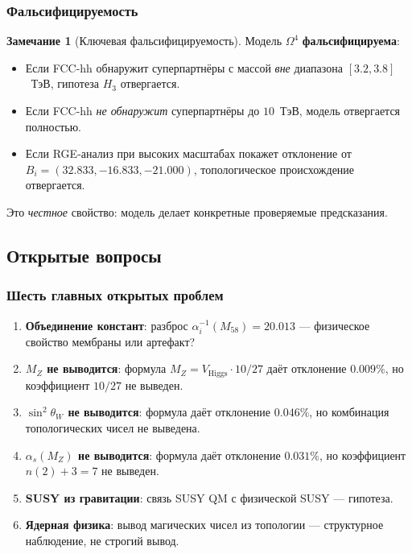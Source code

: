 \documentclass[11pt,a4paper]{article}
\newcommand{\Om}{\ensuremath{\Omega^4}}
\theoremstyle{definition}
\newtheorem{remark}[theorem]{Замечание}
\begin{document}
\subsubsection{Фальсифицируемость}

\begin{remark}[Ключевая фальсифицируемость]
\label{rem:conclusions-falsifiability}
Модель $\Om$ \textbf{фальсифицируема}:
\begin{itemize}
    \item Если FCC-hh обнаружит суперпартнёры с массой
          \emph{вне} диапазона $[3.2, 3.8]$~ТэВ,
          гипотеза $H_3$ отвергается.
    \item Если FCC-hh \emph{не обнаружит} суперпартнёры
          до $10$~ТэВ, модель отвергается полностью.
    \item Если RGE-анализ при высоких масштабах покажет
          отклонение от $B_i = (32.833, -16.833, -21.000)$,
          топологическое происхождение отвергается.
\end{itemize}
Это \emph{честное} свойство: модель делает конкретные
проверяемые предсказания.
\end{remark}

\subsection{Открытые вопросы}
\label{subsec:conclusions-open}

\subsubsection{Шесть главных открытых проблем}

\begin{enumerate}
    \item \textbf{Объединение констант}: разброс
          $\alpha_i^{-1}(M_{58}) = 20.013$ ---
          физическое свойство мембраны или артефакт?
    \item \textbf{$M_Z$ не выводится}: формула
          $M_Z = V_{\text{Higgs}} \cdot 10/27$ даёт
          отклонение $0.009\%$, но коэффициент $10/27$
          не выведен.
    \item \textbf{$\sin^2\theta_W$ не выводится}: формула
          даёт отклонение $0.046\%$, но комбинация
          топологических чисел не выведена.
    \item \textbf{$\alpha_s(M_Z)$ не выводится}: формула
          даёт отклонение $0.031\%$, но коэффициент
          $n(2) + 3 = 7$ не выведен.
    \item \textbf{SUSY из гравитации}: связь SUSY QM
          с физической SUSY --- гипотеза.
    \item \textbf{Ядерная физика}: вывод магических чисел
          из топологии --- структурное наблюдение,
          не строгий вывод.
\end{enumerate}
\end{document}
